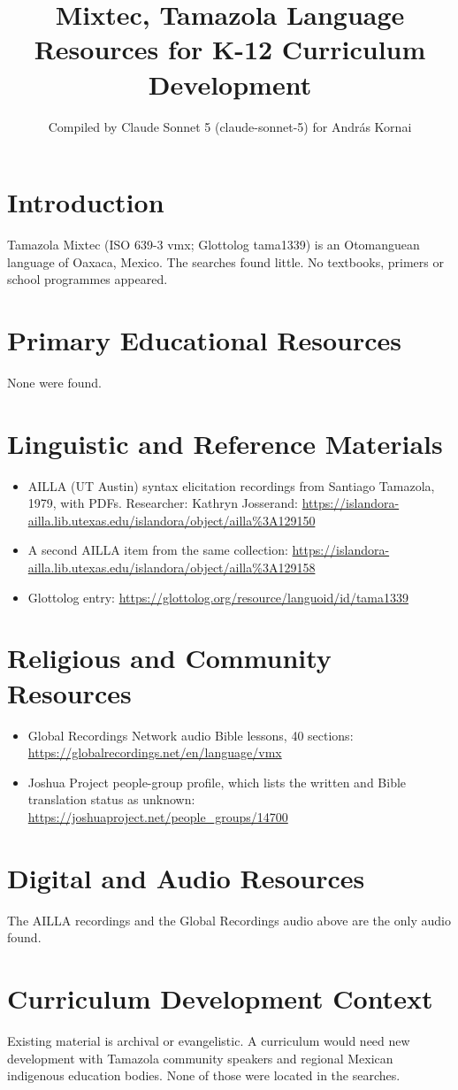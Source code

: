 \documentclass[12pt]{article}
\title{Mixtec, Tamazola Language Resources for K-12 Curriculum Development}
\author{Compiled by Claude Sonnet 5 (claude-sonnet-5) for Andr\'as Kornai}
\date{}
\begin{document}
\maketitle

\section{Introduction}
Tamazola Mixtec (ISO 639-3 vmx; Glottolog tama1339) is an Otomanguean language of Oaxaca, Mexico. The searches found little. No textbooks, primers or school programmes appeared.

\section{Primary Educational Resources}
None were found.

\section{Linguistic and Reference Materials}
\begin{itemize}
\item AILLA (UT Austin) syntax elicitation recordings from Santiago Tamazola, 1979, with PDFs. Researcher: Kathryn Josserand: \url{https://islandora-ailla.lib.utexas.edu/islandora/object/ailla%3A129150}
\item A second AILLA item from the same collection: \url{https://islandora-ailla.lib.utexas.edu/islandora/object/ailla%3A129158}
\item Glottolog entry: \url{https://glottolog.org/resource/languoid/id/tama1339}
\end{itemize}

\section{Religious and Community Resources}
\begin{itemize}
\item Global Recordings Network audio Bible lessons, 40 sections: \url{https://globalrecordings.net/en/language/vmx}
\item Joshua Project people-group profile, which lists the written and Bible translation status as unknown: \url{https://joshuaproject.net/people_groups/14700}
\end{itemize}

\section{Digital and Audio Resources}
The AILLA recordings and the Global Recordings audio above are the only audio found.

\section{Curriculum Development Context}
Existing material is archival or evangelistic. A curriculum would need new development with Tamazola community speakers and regional Mexican indigenous education bodies. None of those were located in the searches.
\end{document}
